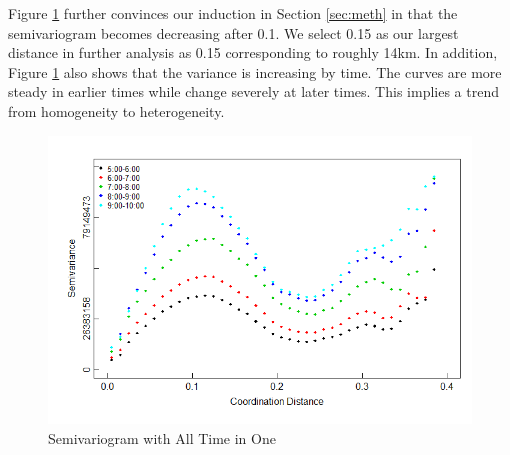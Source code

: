 \documentclass[hidelinks,12pt]{article}
\begin{document}
	Figure \ref{fig:semi_one} further convinces our induction in Section \ref{sec:meth} in that the semivariogram becomes decreasing after 0.1. We select 0.15 as our largest distance in further analysis as 0.15 corresponding to roughly 14km. In addition, Figure \ref{fig:semi_one} also shows that the variance is increasing by time. The curves are more steady in earlier times while change severely at later times. This implies a trend from homogeneity to heterogeneity.
	\begin{figure}[!ht]
		\includegraphics[width=\textwidth]{semi_full.png}
		\caption{Semivariogram with All Time in One \label{fig:semi_one}}
	\end{figure}
\FloatBarrier
	
	
\end{document}
